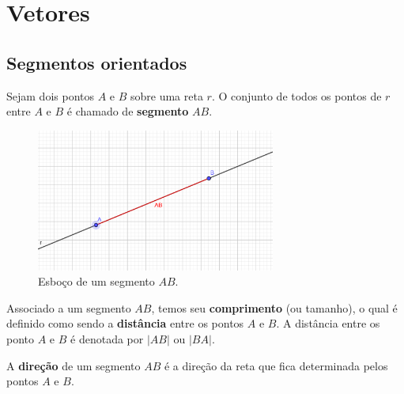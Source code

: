 
\chapter{Vetores}\label{cap_vetor}
\thispagestyle{fancy}

\section{Segmentos orientados}\label{cap_vetor_sec_segorien}

Sejam dois pontos $A$ e $B$ sobre uma reta $r$. O conjunto de todos os pontos de $r$ entre $A$ e $B$ é chamado de {\bf segmento} $AB$.

\begin{figure}[h!]
  \centering
  \includegraphics[width=0.7\textwidth]{./cap_vetor/dados/fig_segmento/fig_segmento}
  \caption{Esboço de um segmento $AB$.}
  \label{fig:segmento}
\end{figure}

Associado a um segmento $AB$, temos seu {\bf comprimento} (ou tamanho), o qual é definido como sendo a {\bf distância} entre os pontos $A$ e $B$. A distância entre os ponto $A$ e $B$ é denotada por $|AB|$ ou $|BA|$.

A {\bf direção} de um segmento $AB$ é a direção da reta que fica determinada pelos pontos $A$ e $B$.

